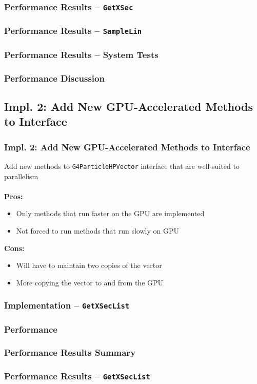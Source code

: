\documentclass{beamer}
\newcommand\pro{\item[$+$]}
\newcommand\con{\item[$-$]}
\begin{document}
\begin{frame}
\frametitle{Performance Results -- \texttt{GetXSec}}
\end{frame}

\begin{frame}
\frametitle{Performance Results -- \texttt{SampleLin}}
\end{frame}

\begin{frame}
\frametitle{Performance Results -- System Tests}
\end{frame}

\begin{frame}
\frametitle{Performance Discussion}
\end{frame}


\subsection{Impl. 2: Add New GPU-Accelerated Methods to Interface}
\begin{frame}
\frametitle{Impl. 2: Add New GPU-Accelerated Methods to Interface}
Add new methods to \texttt{G4ParticleHPVector} interface that are well-suited to parallelism\\~\\

\textbf{Pros:}
\begin{itemize}
\pro Only methods that run faster on the GPU are implemented
\pro Not forced to run methods that run slowly on GPU
\end{itemize}
\textbf{Cons:}
\begin{itemize}
\con Will have to maintain two copies of the vector
\con More copying the vector to and from the GPU
\end{itemize}
\end{frame}

\begin{frame}
\frametitle{Implementation -- \texttt{GetXSecList}}
\end{frame}

\subsubsection{Performance}
\begin{frame}
\frametitle{Performance Results Summary}
\end{frame}

\begin{frame}
\frametitle{Performance Results -- \texttt{GetXSecList}}
\end{frame}
\end{document}
